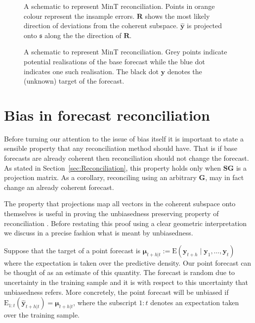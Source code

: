 \documentclass[12pt]{article}
\def\E{\text{E}}
\theoremstyle{definition}
\theoremstyle{property}
\begin{document}
	\begin{figure}[H]
		\centering
		\small
		\resizebox{\linewidth}{!}{
			
		}
		\caption{A schematic to represent MinT reconciliation. Points in orange colour represent the insample errors. $\bm{R}$ shows the most likely direction of deviations from the coherent subspace. $\hat{\bm{y}}$ is projected onto $\mathfrak{s}$ along the the direction of $\bm{R}$.}\label{fig:MinT_justification1}
	\end{figure}
		
	\begin{figure}[H]
		\centering
		\small
		\resizebox{\linewidth}{!}{
			
		}
		\caption{A schematic to represent MinT reconciliation. Grey points indicate potential realisations of the base forecast while the blue dot indicates one such realisation. The black dot ${\bm y}$ denotes the (unknown) target of the forecast.}\label{fig:MinT_justification2}
	\end{figure}
	
	\section{Bias in forecast reconciliation}
	
	Before turning our attention to the issue of bias itself it is important to state a sensible property that any reconciliation method should have.  That is if base forecasts are already coherent then reconciliation should not change the forecast.  As stated in Section~\ref{sec:Reconciliation}, this property holds only when $\bm{SG}$ is a projection matrix.  As a corollary, reconciling using an arbitrary $\bm{G}$,  may in fact change an already coherent forecast.  
	
	The property that projections map all vectors in the coherent subspace onto themselves is useful in proving the unbiasedness preserving property of reconciliation .  Before restating this proof using a  clear geometric interpretation we discuss in a precise fashion what is meant by unbiasedness.  
	
	Suppose that the target of a point forecast is $\bm{\mu}_{t+h|t}:=\E(\bm{y}_{t+h}\mid\bm{y}_{1},\dots,\bm{y}_{t})$ where the expectation is taken over the predictive density.  Our point forecast can be thought of as an estimate of this quantity.  The forecast is random due to uncertainty in the training sample and it is with respect to this uncertainty that unbiasedness refers.  More concretely, the point forecast will be unbiased if $\E_{1:t}(\hat{\bm{y}}_{t+h|t})=\bm{\mu}_{t+h|t}$, where the subscript $1:t$ denotes an expectation taken over the training sample.
	
\end{document}
